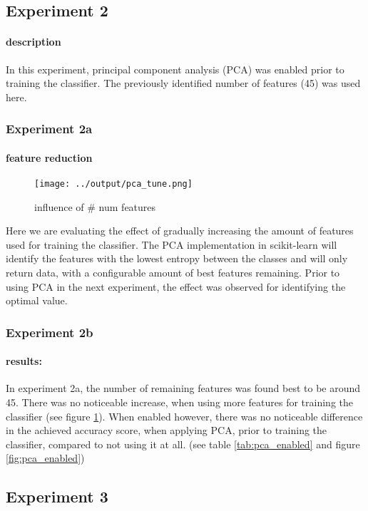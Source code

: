 \documentclass[10pt,a4paper]{proc}
\begin{document}
\subsection{Experiment 2}\label{exp2}
\paragraph{description}
In this experiment, principal component analysis (PCA) was enabled prior to training the classifier. The previously identified number of features (45) was used here.
\subsubsection{Experiment 2a}
\paragraph*{feature reduction}
\begin{figure}[htbp]
\centering
\texttt{[image: ../output/pca\_tune.png]}
\caption{influence of \# num features}
\label{fig:numfeatures}
\end{figure}
Here we are evaluating the effect of gradually increasing the amount of features used for training the classifier. The PCA implementation in scikit-learn will identify the features with the lowest entropy between the classes and will only return data, with a configurable amount of best features remaining. Prior to using PCA in the next experiment, the effect was observed for identifying the optimal value. 
\subsubsection{Experiment 2b}
\paragraph{results:} In experiment 2a, the number of remaining features was found best to be around 45. There was no noticeable increase, when using more features for training the classifier (see figure \ref{fig:numfeatures}). When enabled however, there was no noticeable difference in the achieved accuracy score, when applying PCA, prior to training the classifier, compared to not using it at all. (see table \ref{tab:pca_enabled} and figure \ref{fig:pca_enabled})

\FloatBarrier
\subsection{Experiment 3}\label{exp3}
\end{document}
